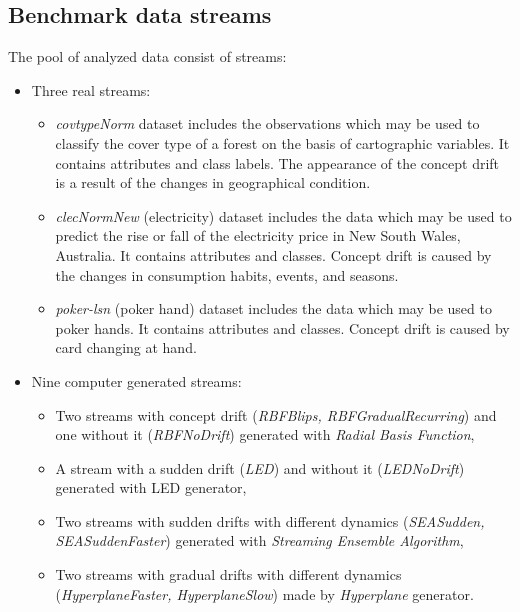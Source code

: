 \subsection{Benchmark data streams}

\noindent The pool of analyzed data consist of  streams:


\begin{itemize}
	\item Three real streams:
    \begin{itemize}
    \item \emph{covtypeNorm} dataset \cite{Frank:2010} includes the observations which may be used to classify the cover type of a forest on the basis of cartographic variables. It contains  attributes and  class labels. The appearance of the concept drift is a result of the changes in geographical condition.
\item \emph{clecNormNew} (electricity) dataset \cite{Harries:1999} includes the data which may be used to predict the rise or fall of the electricity price in New South Wales, Australia. It contains  attributes and  classes. Concept drift is caused by the changes in consumption habits, events, and seasons.
\item\emph{poker-lsn} (poker hand) dataset \cite{Frank:2010} includes the data which may be used to poker hands. It contains  attributes and  classes. Concept drift is caused by card changing at hand.
    \end{itemize}
	\item Nine computer generated streams:
    \begin{itemize}
    \item Two streams with concept drift (\emph{RBFBlips, RBFGradualRecurring}) and one without it (\emph{RBFNoDrift}) generated with \emph{Radial Basis Function},
	\item A stream with a sudden drift (\emph{LED}) and without it (\emph{LEDNoDrift}) generated with LED generator,
	\item Two streams with sudden drifts with different dynamics (\emph{SEASudden, SEASuddenFaster}) generated with \emph{Streaming Ensemble Algorithm}\cite{Street:ui},
	\item Two streams with gradual drifts with different dynamics (\emph{HyperplaneFaster, HyperplaneSlow}) made by \emph{Hyperplane} generator.
    \end{itemize}
\end{itemize}


